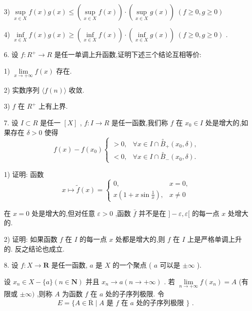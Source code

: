 3) $\mathop{\sup }\limits_{{x \in  X}}f\left( x\right) g\left( x\right)  \leq  \left( {\mathop{\sup }\limits_{{x \in  X}}f\left( x\right) }\right)  \cdot  \left( {\mathop{\sup }\limits_{{x \in  X}}g\left( x\right) }\right) \;\left( {f \geq  0,g \geq  0}\right)$

4) $\mathop{\inf }\limits_{{x \in  X}}f\left( x\right) g\left( x\right)  \geq  \left( {\mathop{\inf }\limits_{{x \in  X}}f\left( x\right) }\right)  \cdot  \left( {\mathop{\inf }\limits_{{x \in  X}}g\left( x\right) }\right) \;\left( {f \geq  0,g \geq  0}\right)$ .

6. 设 $f : {R}^{ + } \rightarrow  R$ 是任一单调上升函数,证明下述三个结论互相等价:

1) $\mathop{\lim }\limits_{{x \rightarrow   + \infty }}f\left( x\right)$ 存在.

2) 实数序列 $\langle f\left( n\right) \rangle$ 收敛.

3) $f$ 在 ${R}^{ + }$ 上有上界.

7. 设 $I \subset  R$ 是任一 $\left\lbrack  X\right\rbrack$ , $f : I \rightarrow  R$ 是任一函数,我们称 $f$ 在 ${x}_{0} \in  I$ 处是增大的,如果存在 $\delta  > 0$ 使得
$$f\left( x\right)  - f\left( {x}_{0}\right) \left\{  \begin{array}{ll}  > 0, & \forall x \in  I \cap  {\overset{ \circ  }{B}}_{ + }\left( {{x}_{0},\delta }\right) , \\   < 0, & \forall x \in  I \cap  {\overset{ \circ  }{B}}_{ - }\left( {{x}_{0},\delta }\right) . \end{array}\right.$$

1) 证明: 函数
$$x \mapsto  \widetilde{f}\left( x\right)  = \left\{  \begin{array}{ll} 0, & x = 0, \\  x\left( {1 + x\sin \frac{1}{x}}\right) , & x \neq  0 \end{array}\right.$$

在 $x = 0$ 处是增大的,但对任意 $\varepsilon  > 0$ ,函数 $\bar{f}$ 并不是在 $\rbrack  - \varepsilon ,\varepsilon \lbrack$ 的每一点 $x$ 处增大的.

2) 证明: 如果函数 $f$ 在 $I$ 的每一点 $x$ 处都是增大的,则 $f$ 在 $I$ 上是严格单调上升的. 反之结论也成立.

8. 设 $f : X \rightarrow  \mathbf{R}$ 是任一函数, $a$ 是 $X$ 的一个聚点 ( $a$ 可以是 $\pm  \infty$ ).

设 ${x}_{n} \in  X - \{ a\} \left( {n \in  \mathbf{N}}\right)$ 并且 ${x}_{n} \rightarrow  a\left( {n \rightarrow   + \infty }\right)$ . 若 $\mathop{\lim }\limits_{{n \rightarrow   + \infty }}f\left( {x}_{n}\right)  = A$ (有限或 $\pm  \infty )$ ,则称 $A$ 为函数 $f$ 在 $a$ 处的子序列极限. 令
$$E = \{ A \in  \overline{\mathrm{R}} \mid  A\text{ 是 }f\text{ 在 }a\text{ 处的子序列极限 }\} \text{ . }$$

